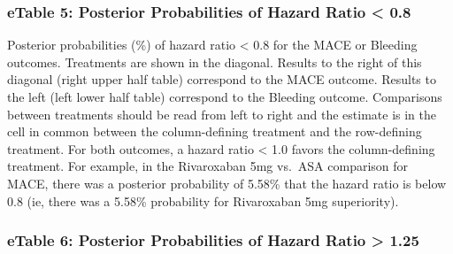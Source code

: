 \documentclass[
  12pt,
]{article}
\begin{document}
\begin{landscape}
\newpage

\hypertarget{etable-5-posterior-probabilities-of-hazard-ratio-0.8}{%
\subsubsection{eTable 5: Posterior Probabilities of Hazard Ratio
\textless{}
0.8}\label{etable-5-posterior-probabilities-of-hazard-ratio-0.8}}

\begin{table}[!h]
\centering
{}
\end{table}

Posterior probabilities (\%) of hazard ratio \textless{} 0.8 for the
MACE or Bleeding outcomes. Treatments are shown in the diagonal. Results
to the right of this diagonal (right upper half table) correspond to the
MACE outcome. Results to the left (left lower half table) correspond to
the Bleeding outcome. Comparisons between treatments should be read from
left to right and the estimate is in the cell in common between the
column-defining treatment and the row-defining treatment. For both
outcomes, a hazard ratio \textless{} 1.0 favors the column-defining
treatment. For example, in the Rivaroxaban 5mg vs.~ASA comparison for
MACE, there was a posterior probability of 5.58\% that the hazard ratio
is below 0.8 (ie, there was a 5.58\% probability for Rivaroxaban 5mg
superiority).

\newpage

\hypertarget{etable-6-posterior-probabilities-of-hazard-ratio-1.25}{%
\subsubsection{eTable 6: Posterior Probabilities of Hazard Ratio
\textgreater{}
1.25}\label{etable-6-posterior-probabilities-of-hazard-ratio-1.25}}


\end{landscape}
\end{document}
